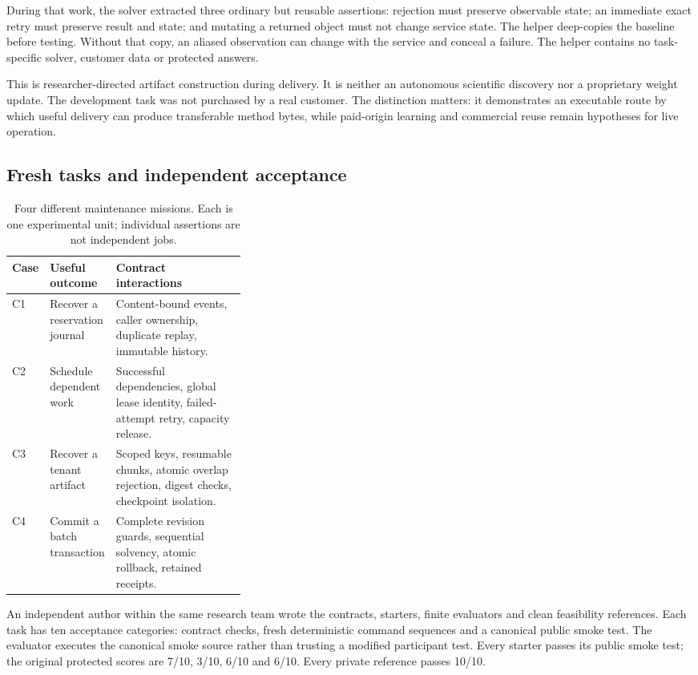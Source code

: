 \documentclass[11pt,letterpaper]{article}
\begin{document}
During that work, the solver extracted three ordinary but reusable assertions: rejection must preserve observable state; an immediate exact retry must preserve result and state; and mutating a returned object must not change service state. The helper deep-copies the baseline before testing. Without that copy, an aliased observation can change with the service and conceal a failure. The helper contains no task-specific solver, customer data or protected answers.

This is researcher-directed artifact construction during delivery. It is neither an autonomous scientific discovery nor a proprietary weight update. The development task was not purchased by a real customer. The distinction matters: it demonstrates an executable route by which useful delivery can produce transferable method bytes, while paid-origin learning and commercial reuse remain hypotheses for live operation.

\subsection{Fresh tasks and independent acceptance}
\begin{table}[H]\small
\begin{tabularx}{\linewidth}{@{}p{0.06\linewidth}p{0.28\linewidth}X@{}}\toprule
Case & Useful outcome & Contract interactions \\ \midrule
C1 & Recover a reservation journal & Content-bound events, caller ownership, duplicate replay, immutable history. \\
C2 & Schedule dependent work & Successful dependencies, global lease identity, failed-attempt retry, capacity release. \\
C3 & Recover a tenant artifact & Scoped keys, resumable chunks, atomic overlap rejection, digest checks, checkpoint isolation. \\
C4 & Commit a batch transaction & Complete revision guards, sequential solvency, atomic rollback, retained receipts. \\ \bottomrule
\end{tabularx}
\caption{Four different maintenance missions. Each is one experimental unit; individual assertions are not independent jobs.}
\end{table}

An independent author within the same research team wrote the contracts, starters, finite evaluators and clean feasibility references. Each task has ten acceptance categories: contract checks, fresh deterministic command sequences and a canonical public smoke test. The evaluator executes the canonical smoke source rather than trusting a modified participant test. Every starter passes its public smoke test; the original protected scores are 7/10, 3/10, 6/10 and 6/10. Every private reference passes 10/10.
\end{document}
